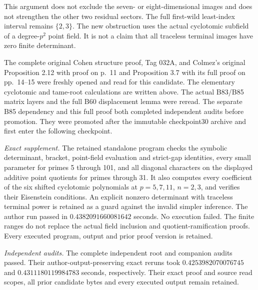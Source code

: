 \begin{remark}
\label{rem:B-RD86-scope}
This argument does not exclude the seven- or
eight-dimensional images and does not strengthen the
other two residual sectors. The full first-wild
least-index interval remains \(\{2,3\}\).
The new obstruction uses the actual cyclotomic
subfield of a degree-\(p^2\) point field. It is not a
claim that all traceless terminal images have zero
finite determinant.

The complete original Cohen structure proof, Tag 032A,
and Colmez's original Proposition 2.12 with proof on
p.~11 and Proposition 3.7 with its full proof on
pp.~14--15 were freshly opened and read for this
candidate. The elementary cyclotomic and tame-root
calculations are written above. The actual B83/B85
matrix layers and the full B60 displacement lemma
were reread. The separate B85 dependency and this full proof
both completed independent audits before promotion.
They were promoted after the immutable checkpoint30
archive and first enter the following checkpoint.

\smallskip
\noindent\emph{Exact supplement.}
The retained standalone program
checks the symbolic determinant, bracket, point-field
evaluation and strict-gap identities, every small
parameter for primes 5 through 101, and all diagonal
characters on the displayed additive point quotients
for primes through 31. It also computes every
coefficient of the six shifted cyclotomic polynomials
at \(p=5,7,11\), \(n=2,3\), and verifies their
Eisenstein conditions. An explicit nonzero determinant
with traceless terminal power is retained as a guard
against the invalid simpler inference. The author run
passed in \(0.4382091660081642\) seconds. No execution failed.
The finite ranges do not replace the actual field
inclusion and quotient-ramification proofs. Every
executed program, output and prior proof version is
retained.

\smallskip
\noindent\emph{Independent audits.}
The complete independent root and companion audits passed.
Their author-output-preserving exact reruns took
\(0.4253982070076745\) and
\(0.4311180119984783\) seconds, respectively.
Their exact proof and source read scopes, all prior
candidate bytes and every executed output remain retained.
\end{remark}


